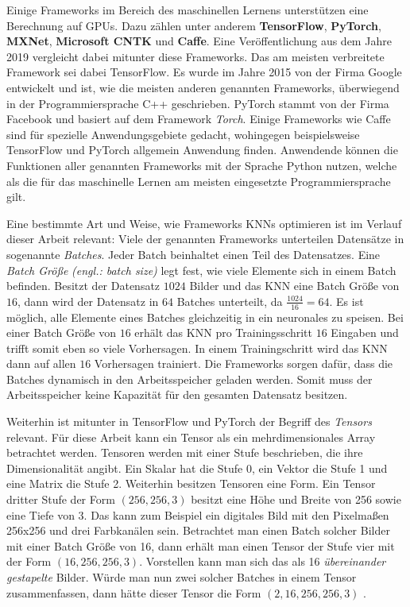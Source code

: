Einige Frameworks im Bereich des maschinellen Lernens unterstützen eine Berechnung auf \acp{GPU}. Dazu zählen unter anderem \textbf{TensorFlow}, \textbf{PyTorch}, \textbf{MXNet}, \textbf{Microsoft CNTK} und \textbf{Caffe}. Eine Veröffentlichung aus dem Jahre 2019 vergleicht dabei mitunter diese Frameworks. Das am meisten verbreitete Framework sei dabei TensorFlow. Es wurde im Jahre 2015 von der Firma Google entwickelt und ist, wie die meisten anderen genannten Frameworks, überwiegend in der Programmiersprache C++ geschrieben. PyTorch stammt von der Firma Facebook und basiert auf dem Framework \emph{Torch}. Einige Frameworks wie Caffe sind für spezielle Anwendungsgebiete gedacht, wohingegen beispielsweise TensorFlow und PyTorch allgemein Anwendung finden. Anwendende können die Funktionen aller genannten Frameworks mit der Sprache Python nutzen, welche als die für das maschinelle Lernen am meisten eingesetzte Programmiersprache gilt. \cite{frameworks}

Eine bestimmte Art und Weise, wie Frameworks \acp{KNN} optimieren ist im Verlauf dieser Arbeit relevant: Viele der genannten Frameworks unterteilen Datensätze in sogenannte \emph{Batches}. Jeder Batch beinhaltet einen Teil des Datensatzes. Eine \emph{Batch Größe} \emph{(engl.: batch size)} legt fest, wie viele Elemente sich in einem Batch befinden. Besitzt der Datensatz $1024$ Bilder und das \ac{KNN} eine Batch Größe von $16$, dann wird der Datensatz in $64$ Batches unterteilt, da $\frac{1024}{16} = 64$. Es ist möglich, alle Elemente eines Batches gleichzeitig in ein neuronales zu speisen. Bei einer Batch Größe von $16$ erhält das \ac{KNN} pro Trainingsschritt $16$ Eingaben und trifft somit eben so viele Vorhersagen. In einem Trainingschritt wird das \ac{KNN} dann auf allen $16$ Vorhersagen trainiert. Die Frameworks sorgen dafür, dass die Batches dynamisch in den Arbeitsspeicher geladen werden. Somit muss der Arbeitsspeicher keine Kapazität für den gesamten Datensatz besitzen. \cite{tf-dataset}

Weiterhin ist mitunter in TensorFlow und PyTorch der Begriff des \emph{Tensors} relevant. Für diese Arbeit kann ein Tensor als ein mehrdimensionales Array betrachtet werden. Tensoren werden mit einer Stufe beschrieben, die ihre Dimensionalität angibt. Ein Skalar hat die Stufe 0, ein Vektor die Stufe 1 und eine Matrix die Stufe 2. Weiterhin besitzen Tensoren eine Form. Ein Tensor dritter Stufe der Form $(256, 256, 3)$ besitzt eine Höhe und Breite von 256 sowie eine Tiefe von 3. Das kann zum Beispiel ein digitales Bild mit den Pixelmaßen 256x256 und drei Farbkanälen sein. Betrachtet man einen Batch solcher Bilder mit einer Batch Größe von 16, dann erhält man einen Tensor der Stufe vier mit der Form $(16, 256, 256, 3)$. Vorstellen kann man sich das als 16 \emph{übereinander gestapelte} Bilder. Würde man nun zwei solcher Batches in einem Tensor zusammenfassen, dann hätte dieser Tensor die Form $(2, 16, 256, 256, 3)$ \cite{learn-tensorflow}.